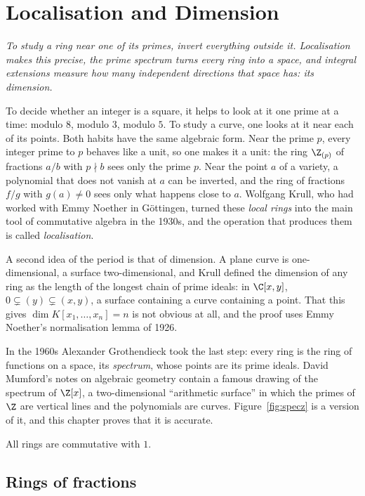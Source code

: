 \chapter{Localisation and Dimension}

\begin{center}\itshape
To study a ring near one of its primes, invert everything outside it. Localisation makes this precise, the prime spectrum turns every ring into a space, and integral extensions
measure how many independent directions that space has: its dimension.
\end{center}

To decide whether an integer is a square, it helps to look at it one prime at a time: modulo $8$, modulo $3$, modulo $5$. To study a curve, one looks at it near each of its points. Both
habits have the same algebraic form. Near the prime $p$, every integer prime to $p$ behaves like a unit, so one makes it a unit: the ring $\Z_{(p)}$ of fractions $a/b$ with $p\nmid b$
sees only the prime $p$. Near the point $a$ of a variety, a polynomial that does not vanish at $a$ can be inverted, and the ring of fractions $f/g$ with $g(a)\ne0$ sees only what happens close to $a$.
Wolfgang Krull, who had worked with Emmy Noether in Göttingen, turned these \emph{local rings} into the main tool of commutative algebra in the 1930s, and the operation that produces them is called
\emph{localisation}.

A second idea of the period is that of dimension. A plane curve is one-dimensional, a surface two-dimensional, and Krull defined the dimension of any ring as the length of the
longest chain of prime ideals: in $\C[x,y]$, $0\subsetneq(y)\subsetneq(x,y)$, a surface containing a curve containing a point. That this gives $\dim K[x_1,\dots,x_n]=n$ is not obvious at
all, and the proof uses Emmy Noether's normalisation lemma of 1926.

In the 1960s Alexander Grothendieck took the last step: every ring is the ring of functions on a space, its \emph{spectrum}, whose points are its prime ideals. David Mumford's notes on
algebraic geometry contain a famous drawing of the spectrum of $\Z[x]$, a two-dimensional ``arithmetic surface'' in which the primes of $\Z$ are vertical lines and the polynomials are
curves. Figure~\ref{fig:specz} is a version of it, and this chapter proves that it is accurate.

All rings are commutative with $1$.

\section{Rings of fractions}

